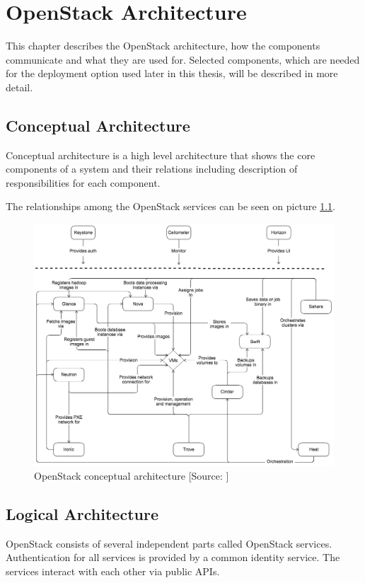 \chapter{OpenStack Architecture}
\label{ch:arch}
This chapter describes the OpenStack architecture, how the components communicate and what they are used for. Selected components, which are needed for the deployment option used later in this thesis, will be described in more detail.

\section{Conceptual Architecture}
Conceptual architecture is a high level architecture that shows the core components of a system and their relations including description of responsibilities for each component.

The relationships among the OpenStack services can be seen on picture \ref{fig:openstack_conceptual_arch}.
\begin{figure}[!h]
  \includegraphics[width=\textwidth]{fig/openstack_conceptual_arch.png}
  \caption{OpenStack conceptual architecture [Source: \cite{conceptualArch}]}
  \label{fig:openstack_conceptual_arch}
\end{figure}





\section{Logical Architecture}
OpenStack consists of several independent parts called OpenStack services.\cite{CL210} Authentication for all services is provided by a common identity service. The services interact with each other via public APIs. \cite{AdminGuide}

